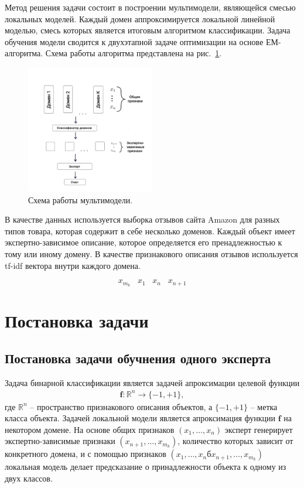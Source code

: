 \documentclass[12pt, twoside]{article}
\begin{document}
Метод решения задачи состоит в построении мультимодели, являющейся смесью локальных моделей. Каждый домен аппроксимируется локальной линейной моделью, смесь которых является итоговым алгоритмом классификации. Задача обучения модели сводится к двухэтапной задаче оптимизации на основе ЕМ-алгоритма. Схема работы алгоритма представлена на рис.~\ref{example:1}.

\begin{figure}[H]\center
\includegraphics[width=0.5\textwidth]{fig/Schem_1.jpg}
\caption{Схема работы мультимодели.}
\label{example:1}
\end{figure}

В качестве данных используется выборка отзывов сайта Amazon для разных типов товара, которая содержит в себе несколько доменов. Каждый объект имеет экспертно-зависимое описание, которое определяется его пренадлежностью к тому или иному домену. В качестве признакового описания отзывов используется tf-idf вектора внутри каждого домена. 

\[x_{m_k} \hspace{10pt} x_1 \hspace{10pt} x_n \hspace{10pt} x_{n+1}\]


\section{Постановка задачи}
\subsection{Постановка задачи обучнения одного эксперта}
Задача бинарной классификации является задачей апроксимации целевой функции
\[
\label{eq:st:1.1}
\begin{aligned}
\mathbf{f}: \mathbb{R}^n \to \{-1, +1\},
\end{aligned}
\]
где $\mathbb{R}^n$ -- пространство признакового описания объектов, а $\{-1, +1\}$ -- метка класса объекта. Задачей локальной модели является апроксимация функции $\mathbf{f}$ на некотором домене. На основе общих признаков $(x_1, \ldots, x_n)$ эксперт генерирует экспертно-зависимые признаки $(x_{n+1}, \ldots, x_{m_k})$, количество которых зависит от конкретного домена, и с помощью признаков $(x_1, \ldots, x_nб x_{n+1}, \ldots, x_{m_k})$ локальная модель делает предсказание о принадлежности объекта к одному из двух классов.
\end{document}
